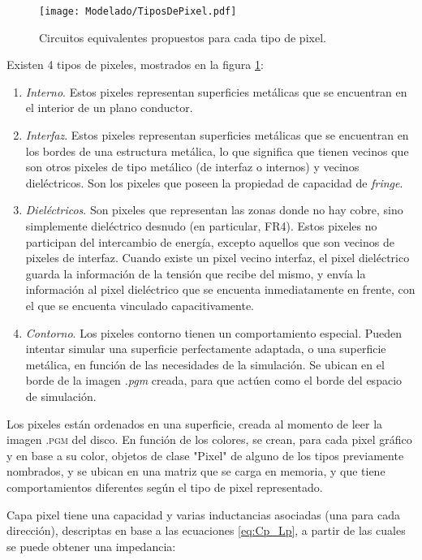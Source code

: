 \begin{figure}[h]
	\centering
	\texttt{[image: Modelado/TiposDePixel.pdf]}
	\caption{Circuitos equivalentes propuestos para cada tipo de pixel.}
	\label{fig:tiposdepixeles}
\end{figure}

Existen 4 tipos de pixeles, mostrados en la figura \ref{fig:tiposdepixeles}:
\begin{enumerate}
	\item \textit{Interno}. Estos pixeles representan superficies metálicas que se encuentran en el interior de un plano conductor.
	\item \textit{Interfaz}. Estos pixeles representan superficies metálicas que se encuentran en los bordes de una estructura metálica, lo que significa que tienen vecinos que son otros pixeles de tipo metálico (de interfaz o internos) y vecinos dieléctricos. Son los pixeles que poseen la propiedad de capacidad de \textit{fringe}.
	\item \textit{Dieléctricos}. Son pixeles que representan las zonas donde no hay cobre, sino simplemente dieléctrico desnudo (en particular, FR4). Estos pixeles no participan del intercambio de energía, excepto aquellos que son vecinos de pixeles de interfaz. Cuando existe un pixel vecino interfaz, el pixel dieléctrico guarda la información de la tensión que recibe del mismo, y envía la información al pixel dieléctrico que se encuenta inmediatamente en frente, con el que se encuenta vinculado capacitivamente.
	\item \textit{Contorno}. Los pixeles contorno tienen un comportamiento especial. Pueden intentar simular una superficie perfectamente adaptada, o una superficie metálica, en función de las necesidades de la simulación. Se ubican en el borde de la imagen \textit{.pgm} creada, para que actúen como el borde del espacio de simulación.
\end{enumerate}

Los pixeles están ordenados en una superficie, creada al momento de leer la imagen \textsc{.pgm} del disco. En función de los colores, se crean, para cada pixel gráfico y en base a su color, objetos de clase "Pixel" de alguno de los tipos previamente nombrados, y se ubican en una matriz que se carga en memoria, y que tiene comportamientos diferentes según el tipo de pixel representado.

Capa pixel tiene una capacidad y varias inductancias asociadas (una para cada dirección), descriptas en base a las ecuaciones \ref{eq:Cp_Lp}, a partir de las cuales se puede obtener una impedancia:


